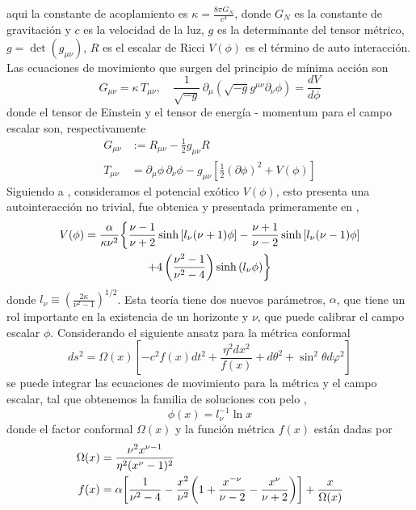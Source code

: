\documentclass[../Main.tex]{subfiles}
\begin{document}
aqui la constante de acoplamiento es $\kappa=\frac{8\pi G_{N}}{c^{4}}$, donde $G_N$ es la constante de gravitación y $c$ es la velocidad de la luz, $g$ es la determinante del tensor métrico, $g=\det (g_{\mu\nu})$, $R$ es el escalar de Ricci $V(\phi)$ es el término de auto interacción.
%
Las ecuaciones de movimiento que surgen del principio de mínima acción son
%
\begin{equation}
  G_{\mu\nu}
  =\kappa\,T_{\mu\nu}, \quad
  \frac{1}{\sqrt{-g}}\,\partial_{\mu}
  \left(\sqrt{-g}g^{\mu\nu}\partial_{\nu}\phi\right)
  =\frac{dV}{d\phi}
\end{equation}
%
donde el tensor de Einstein y el tensor de energía - momentum para el campo escalar son, respectivamente 
%
\begin{equation}
  \begin{split}
    G_{\mu\nu} & :=R_{\mu\nu}-\frac{1}{2}g_{\mu\nu}R \\
    T_{\mu\nu} & =
    \partial_{\mu}\phi\,\partial_{\nu}\phi
    -g_{\mu\nu}\left[\frac{1}{2}\left(\partial\phi\right)^2
      +V(\phi)\right]
  \end{split}
\end{equation}
%
Siguiendo a \cite{Anabalon:2013eaa,Anabalon:2017yhv,Anabalon:2012ih,Anabalon:2016izw}, 
consideramos el potencial exótico $V(\phi)$, esto presenta una autointeracción no trivial, fue obtenica y presentada primeramente en \cite{Anabalon:2013eaa},
%
\begin{multline}
  V(\phi)=\frac{\alpha}{\kappa\nu^2}\biggl{\{}\frac{\nu-1}{\nu+2}\sinh{\left[l_\nu(\nu+1)\phi\right]}-\frac{\nu+1}{\nu-2}\sinh{[l_{\nu}(\nu-1)\phi]}
  \\+4\left(\frac{\nu^{2}-1}{\nu^{2}-4}\right)\sinh{(l_\nu\phi)}
  \biggr{\}}
  \label{pot1}
\end{multline}
%
donde $l_{\nu}\equiv\left(\frac{2\kappa}{\nu^{2}-1}\right)^{1/2}$. Esta teoría tiene dos nuevos parámetros, $\alpha$, que tiene un rol importante en la existencia de un horizonte y $\nu$, que puede calibrar el campo escalar $\phi$.
Considerando el siguiente ansatz para la métrica conformal
%
\begin{equation}
  ds^{2}=\Omega(x)\left[  -c^{2}f(x)dt^{2}+\frac{\eta^{2}dx^{2}}{f(x)}+d\theta
  ^{2}+\sin^{2}\theta d\varphi^{2}\right]  \label{Ansatz}%
\end{equation}
%
se puede integrar las ecuaciones de movimiento para la métrica y el campo escalar, tal que obtenemos la familia de soluciones con pelo \cite{Anabalon:2013sra,Anabalon:2013qua,Acena:2012mr,Acena:2013jya},
%
\begin{equation}
  \phi(x)=l_{\nu}^{-1}\ln{x}
\end{equation}
%
donde el factor conformal $\Omega(x)$ y la función métrica $f(x)$ están dadas por
\begin{equation}
  \begin{split}
    \Omega(x) & =\frac{\nu^{2}x^{\nu-1}}{\eta^{2}(x^{\nu}-1)^{2}} \\
    f(x) & =\alpha\biggl{[}\frac{1}{\nu^{2}-4}-\frac{x^{2}}{\nu^{2}%
    }\biggl{(}1+\frac{x^{-\nu}}{\nu-2}-\frac{x^\nu}{\nu+2}%
    \biggr{)}\biggr{]} +\frac{x}{\Omega(x)}
    \label{omega}
  \end{split}
\end{equation}
\end{document}
